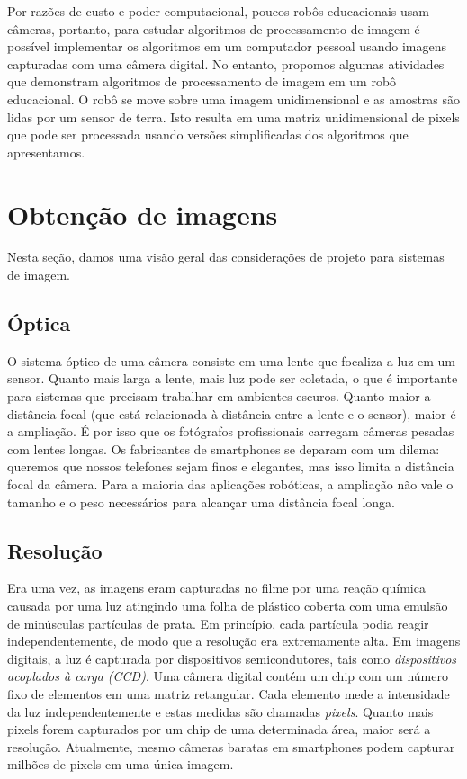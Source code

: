 Por razões de custo e poder computacional, poucos robôs educacionais usam câmeras, portanto, para estudar algoritmos de processamento de imagem é possível implementar os algoritmos em um computador pessoal usando imagens capturadas com uma câmera digital. No entanto, propomos algumas atividades que demonstram algoritmos de processamento de imagem em um robô educacional. O robô se move sobre uma imagem unidimensional e as amostras são lidas por um sensor de terra. Isto resulta em uma matriz unidimensional de pixels que pode ser processada usando versões simplificadas dos algoritmos que apresentamos.

\section{Obtenção de imagens}\label{s.obtaining-images}

Nesta seção, damos uma visão geral das considerações de projeto para sistemas de imagem.

\subsection*{Óptica}

O sistema óptico de uma câmera consiste em uma lente que focaliza a luz em um sensor. Quanto mais larga a lente, mais luz pode ser coletada, o que é importante para sistemas que precisam trabalhar em ambientes escuros. Quanto maior a distância focal (que está relacionada à distância entre a lente e o sensor), maior é a ampliação. É por isso que os fotógrafos profissionais carregam câmeras pesadas com lentes longas. Os fabricantes de smartphones se deparam com um dilema: queremos que nossos telefones sejam finos e elegantes, mas isso limita a distância focal da câmera. Para a maioria das aplicações robóticas, a ampliação não vale o tamanho e o peso necessários para alcançar uma distância focal longa.

\subsection*{Resolução}

Era uma vez, as imagens eram capturadas no filme por uma reação química causada por uma luz atingindo uma folha de plástico coberta com uma emulsão de minúsculas partículas de prata. Em princípio, cada partícula podia reagir independentemente, de modo que a resolução era extremamente alta. Em imagens digitais, a luz é capturada por dispositivos semicondutores, tais como \emph{dispositivos acoplados à carga (CCD)}. Uma câmera digital contém um chip com um número fixo de elementos em uma matriz retangular. Cada elemento mede a intensidade da luz independentemente e estas medidas são chamadas \emph{pixels}. Quanto mais pixels forem capturados por um chip de uma determinada área, maior será a resolução. Atualmente, mesmo câmeras baratas em smartphones podem capturar milhões de pixels em uma única imagem.

